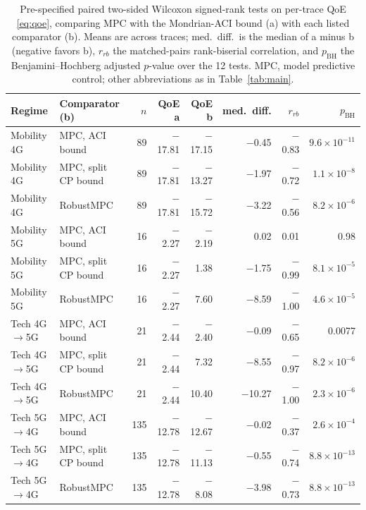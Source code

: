 \begin{table}[!t]
\caption{Pre-specified paired two-sided Wilcoxon signed-rank tests on per-trace QoE \eqref{eq:qoe}, comparing MPC with the Mondrian-ACI bound (a) with each listed comparator (b). Means are across traces; med.\ diff.\ is the median of a minus b (negative favors b), $r_{rb}$ the matched-pairs rank-biserial correlation, and $p_{\mathrm{BH}}$ the Benjamini--Hochberg adjusted $p$-value over the 12 tests. MPC, model predictive control; other abbreviations as in Table~\ref{tab:main}.}
\label{tab:hastests}
\centering
\footnotesize
\begin{tabular}{llrrrrrr}
\toprule
Regime & Comparator (b) & $n$ & QoE a & QoE b & med.\ diff. & $r_{rb}$ & $p_{\mathrm{BH}}$ \\
\midrule
Mobility 4G & MPC, ACI bound & 89 & $-$17.81 & $-$17.15 & $-$0.45 & $-$0.83 & $9.6\times10^{-11}$ \\
Mobility 4G & MPC, split CP bound & 89 & $-$17.81 & $-$13.27 & $-$1.97 & $-$0.72 & $1.1\times10^{-8}$ \\
Mobility 4G & RobustMPC & 89 & $-$17.81 & $-$15.72 & $-$3.22 & $-$0.56 & $8.2\times10^{-6}$ \\
Mobility 5G & MPC, ACI bound & 16 & $-$2.27 & $-$2.19 & 0.02 & 0.01 & 0.98 \\
Mobility 5G & MPC, split CP bound & 16 & $-$2.27 & 1.38 & $-$1.75 & $-$0.99 & $8.1\times10^{-5}$ \\
Mobility 5G & RobustMPC & 16 & $-$2.27 & 7.60 & $-$8.59 & $-$1.00 & $4.6\times10^{-5}$ \\
Tech 4G$\rightarrow$5G & MPC, ACI bound & 21 & $-$2.44 & $-$2.40 & $-$0.09 & $-$0.65 & 0.0077 \\
Tech 4G$\rightarrow$5G & MPC, split CP bound & 21 & $-$2.44 & 7.32 & $-$8.55 & $-$0.97 & $8.2\times10^{-6}$ \\
Tech 4G$\rightarrow$5G & RobustMPC & 21 & $-$2.44 & 10.40 & $-$10.27 & $-$1.00 & $2.3\times10^{-6}$ \\
Tech 5G$\rightarrow$4G & MPC, ACI bound & 135 & $-$12.78 & $-$12.67 & $-$0.02 & $-$0.37 & $2.6\times10^{-4}$ \\
Tech 5G$\rightarrow$4G & MPC, split CP bound & 135 & $-$12.78 & $-$11.13 & $-$0.55 & $-$0.74 & $8.8\times10^{-13}$ \\
Tech 5G$\rightarrow$4G & RobustMPC & 135 & $-$12.78 & $-$8.08 & $-$3.98 & $-$0.73 & $8.8\times10^{-13}$ \\
\bottomrule
\end{tabular}
\end{table}
